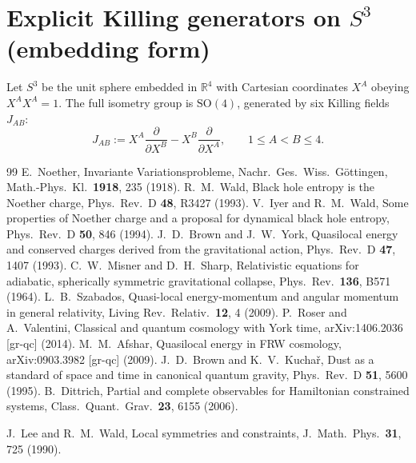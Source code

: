 \documentclass[
  reprint,
  amsmath,amssymb,
  aps,
  prd,
  superscriptaddress,
  nofootinbib,
  longbibliography
]{revtex4-2}
\begin{document}
\section{Explicit Killing generators on \texorpdfstring{$S^3$}{S3} (embedding form)}
Let $S^3$ be the unit sphere embedded in $\mathbb{R}^4$ with Cartesian coordinates $X^A$ obeying $X^AX^A=1$.
The full isometry group is $\mathrm{SO}(4)$, generated by six Killing fields $J_{AB}$:
\begin{equation}
J_{AB} := X^A\frac{\partial}{\partial X^B}-X^B\frac{\partial}{\partial X^A},
\qquad 1\le A<B\le 4.
\end{equation}
\begin{thebibliography}{99}
E.~Noether,
\newblock Invariante Variationsprobleme,
\newblock Nachr.\ Ges.\ Wiss.\ G\"ottingen, Math.-Phys.\ Kl.\ \textbf{1918}, 235 (1918).
R.~M.~Wald,
\newblock Black hole entropy is the Noether charge,
\newblock Phys.\ Rev.\ D \textbf{48}, R3427 (1993).
V.~Iyer and R.~M.~Wald,
\newblock Some properties of Noether charge and a proposal for dynamical black hole entropy,
\newblock Phys.\ Rev.\ D \textbf{50}, 846 (1994).
J.~D.~Brown and J.~W.~York,
\newblock Quasilocal energy and conserved charges derived from the gravitational action,
\newblock Phys.\ Rev.\ D \textbf{47}, 1407 (1993).
C.~W.~Misner and D.~H.~Sharp,
\newblock Relativistic equations for adiabatic, spherically symmetric gravitational collapse,
\newblock Phys.\ Rev.\ \textbf{136}, B571 (1964).
L.~B.~Szabados,
\newblock Quasi-local energy-momentum and angular momentum in general relativity,
\newblock Living Rev.\ Relativ.\ \textbf{12}, 4 (2009).
P.~Roser and A.~Valentini,
\newblock Classical and quantum cosmology with York time,
\newblock arXiv:1406.2036 [gr-qc] (2014).
M.~M.~Afshar,
\newblock Quasilocal energy in FRW cosmology,
\newblock arXiv:0903.3982 [gr-qc] (2009).
J.~D.~Brown and K.~V.~Kucha\v{r},
\newblock Dust as a standard of space and time in canonical quantum gravity,
\newblock Phys.\ Rev.\ D \textbf{51}, 5600 (1995).
B.~Dittrich,
\newblock Partial and complete observables for Hamiltonian constrained systems,
\newblock Class.\ Quant.\ Grav.\ \textbf{23}, 6155 (2006).


J.~Lee and R.~M.~Wald,
\newblock Local symmetries and constraints,
\newblock J.\ Math.\ Phys.\ \textbf{31}, 725 (1990).


\end{thebibliography}
\end{document}
